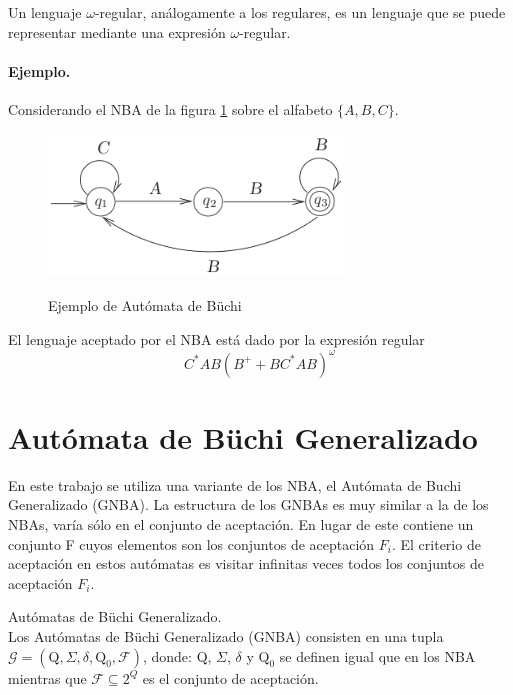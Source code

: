 Un lenguaje $\omega$-regular, análogamente a los regulares, es un lenguaje que se puede representar
mediante una expresión $\omega$-regular.


 
 
\paragraph{Ejemplo.}
Considerando el NBA de la figura \ref{fig:nba} sobre el alfabeto $\{ A, B, C \}$.\\

\begin{figure}[hbtp]
\begin{center}
\caption{Ejemplo de Autómata de Büchi}
\includegraphics[width=0.7\textwidth]{buchi/imagenes/ejemplo4_28.png}
\label{fig:nba}
\end{center}
\end{figure}

El lenguaje aceptado por el NBA está dado por la expresión regular
\[ C^*AB(B^+ + BC^*AB)^\omega \]
 
\section{Autómata de Büchi Generalizado}
En este trabajo se utiliza una variante de los NBA, el Autómata de Buchi Generalizado (GNBA).
La estructura de los GNBAs es muy similar a la de los NBAs, varía sólo en el conjunto de aceptación.
En lugar de este contiene un conjunto F cuyos elementos son los conjuntos de aceptación $F_i$.
El criterio de aceptación en estos autómatas es visitar infinitas veces todos los conjuntos de
 aceptación $F_i$.

\begin{definicion}
Autómatas de Büchi Generalizado.\\
Los Autómatas de Büchi Generalizado (GNBA) consisten en una tupla $\mathcal{G} = (\text{Q}, \Sigma, \delta, \text{Q}_0, \mathcal{F})$, donde: $\text{Q}$, $\Sigma$, $\delta$ y $\text{Q}_0$ se definen
igual que en los NBA mientras que $\mathcal{F} \subseteq 2^Q$ es el conjunto de aceptación.
\end{definicion}

